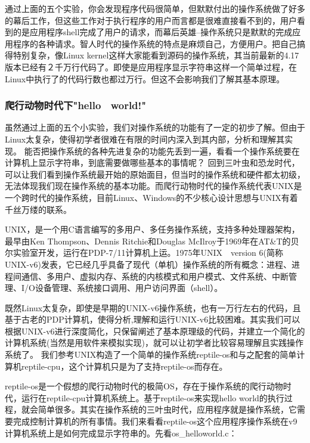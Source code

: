 通过上面的五个实验，你会发现程序代码很简单，但默默付出的操作系统做了好多的幕后工作，但这些工作对于执行程序的用户而言都是很难直接看不到的，用户看到的是应用程序shell完成了用户的请求，而幕后英雄--操作系统只是默默的完成应用程序的各种请求。智人时代的操作系统的特点是麻烦自己，方便用户。把自己搞得特别复杂，像Linux kernel这样大家能看到源码的操作系统，其当前最新的4.17版本已经有２千万行代码了。即使是应用程序显示字符串这样一个简单过程，在Linux中执行了的代码行数也都过万行。但这不会影响我们了解其基本原理。

\subsubsection{爬行动物时代下"hello　world!"}

虽然通过上面的五个小实验，我们对操作系统的功能有了一定的初步了解。但由于Linux太复杂，使得初学者很难在有限的时间内深入到其内部，分析和理解其实现。
能否把操作系统的各种先进复杂的功能先丢到一遍，看看一个操作系统要在计算机上显示字符串，到底需要做哪些基本的事情呢？
回到三叶虫和恐龙时代，可以让我们看到操作系统最开始的原始面目，但当时的操作系统和硬件都太初级，无法体现我们现在操作系统的基本功能。而爬行动物时代的操作系统代表UNIX是一个跨时代的操作系统，目前Linux、Windows的不少核心设计思想与UNIX有着千丝万缕的联系。

\begin{note} 
UNIX，是一个用C语言编写的多用户、多任务操作系统，支持多种处理器架构，最早由Ken Thompson、Dennis Ritchie和Douglas McIlroy于1969年在AT\&T的贝尔实验室开发，运行在PDP-7/11计算机上运。1975年UNIX　version 6(简称UNIX-v6)发表，它已经几乎具备了现代（单机）操作系统的所有概念：进程、进程间通信、多用户、虚拟内存、系统的内核模式和用户模式、文件系统、中断管理、I/O设备管理、系统接口调用、用户访问界面（shell）。
\end{note} 
	
既然Linux太复杂，即使是早期的UNIX-v6操作系统，也有一万行左右的代码，且基于古老的PDP计算机，使得分析,理解和运行UNIX-v6比较困难。其实我们可以根据UNIX-v6进行深度简化，只保留阐述了基本原理级的代码，并建立一个简化的计算机系统(当然是用软件来模拟实现)，就可以让初学者比较容易理解且实践操作系统了。
我们参考UNIX构造了一个简单的操作系统reptile-os和与之配套的简单计算机reptile-cpu，这个计算机只是为了支持reptile-os而存在。


reptile-os是一个假想的爬行动物时代的极简OS，存在于操作系统的爬行动物时代，运行在reptile-cpu计算机系统上。基于reptile-os来实现hello world的执行过程，就会简单很多。其实在操作系统的三叶虫时代，应用程序就是操作系统，它需要完成控制计算机的所有事情。我们来看看reptile-os这个应用程序操作系统在v9计算机系统上是如何完成显示字符串的。先看os\_helloworld.c：
 
